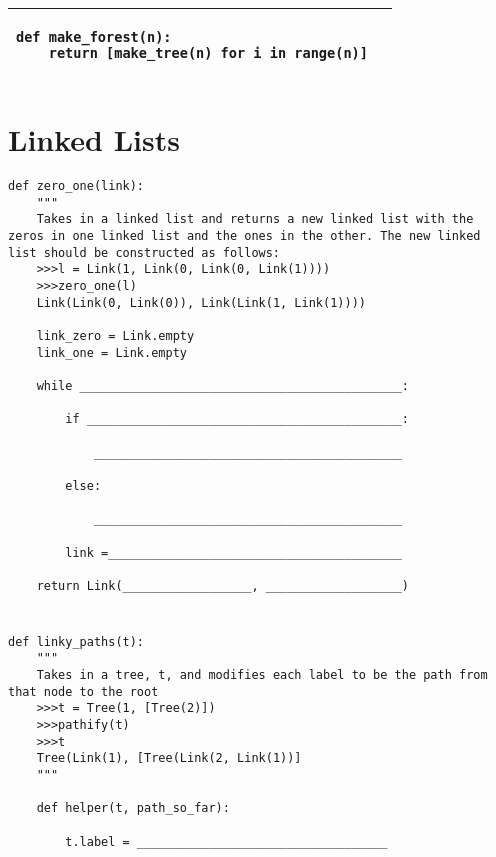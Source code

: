 \documentclass{exam}
\begin{document}
\begin{questions}
\begin{center}
\begin{tabular}{ |p{13cm}|p{2cm}| }
\begin{lstlisting}
def make_forest(n):
    return [make_tree(n) for i in range(n)]
\end{lstlisting} &  \\  \hline
\end{tabular}
\end{center}

\clearpage

\section{Linked Lists}
\question
\begin{lstlisting}
def zero_one(link):
    """
    Takes in a linked list and returns a new linked list with the zeros in one linked list and the ones in the other. The new linked list should be constructed as follows:
    >>>l = Link(1, Link(0, Link(0, Link(1))))
    >>>zero_one(l)
    Link(Link(0, Link(0)), Link(Link(1, Link(1)))) 

    link_zero = Link.empty
    link_one = Link.empty

    while _____________________________________________:

        if ____________________________________________:

            ___________________________________________

        else:

            ___________________________________________

        link =_________________________________________

    return Link(__________________, ___________________)

\end{lstlisting}

\newpage

\section{}

\begin{blocksection}
\question
\begin{lstlisting}
def linky_paths(t):
    """ 
    Takes in a tree, t, and modifies each label to be the path from that node to the root
    >>>t = Tree(1, [Tree(2)])
    >>>pathify(t)
    >>>t
    Tree(Link(1), [Tree(Link(2, Link(1))]
    """

    def helper(t, path_so_far):

        t.label = ___________________________________


\end{lstlisting}
\end{blocksection}
\end{questions}
\end{document}
